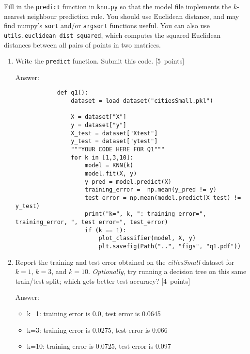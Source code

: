 \documentclass{article}
\newcommand{\blu}[1]{{\textcolor{blu}{#1}}}
\newenvironment{answer}{\par\begingroup\color{gre}Answer: }{\endgroup}
\let\ask\blu
\newcommand\pts[1]{\textcolor{pointscolour}{[#1~points]}}
\begin{document}
    Fill in the \texttt{predict} function in \texttt{knn.py} so that the model file implements the $k$-nearest neighbour prediction rule.
    You should use Euclidean distance, and may find numpy's \texttt{sort} and/or \texttt{argsort} functions useful.
    You can also use \texttt{utils.euclidean\string_dist\string_squared}, which computes the squared Euclidean distances between all pairs of points in two matrices.
    \begin{enumerate}
        \item Write the \texttt{predict} function. \ask{Submit this code.} \pts{5}
        \begin{answer}
            \begin{verbatim}
            def q1():
                dataset = load_dataset("citiesSmall.pkl")

                X = dataset["X"]
                y = dataset["y"]
                X_test = dataset["Xtest"]
                y_test = dataset["ytest"]
                """YOUR CODE HERE FOR Q1"""
                for k in [1,3,10]:
                    model = KNN(k)
                    model.fit(X, y)
                    y_pred = model.predict(X)
                    training_error =  np.mean(y_pred != y)
                    test_error = np.mean(model.predict(X_test) != y_test)
                    print("k=", k, ": training error=", training_error, ", test error=", test_error)
                    if (k == 1):
                        plot_classifier(model, X, y)
                        plt.savefig(Path("..", "figs", "q1.pdf"))              
            \end{verbatim}
        \end{answer}
        \newpage
        \item \ask{Report the training and test error} obtained on the \emph{citiesSmall} dataset for $k=1$, $k=3$, and $k=10$. \emph{Optionally}, try running a decision tree on this same train/test split; which gets better test accuracy? \pts{4}
        \begin{answer}
            \begin{itemize}
                \item k=1: training error is 0.0, test error is 0.0645
                \item k=3: training error is 0.0275, test error is 0.066
                \item k=10: training error is 0.0725, test error is 0.097
            \end{itemize}
        \end{answer}

\end{enumerate}
\end{document}
